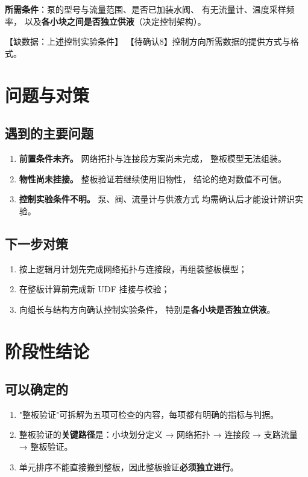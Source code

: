 \documentclass[stage2,fontset=fandol]{ydzjreport}
\begin{document}
\textbf{所需条件}：泵的型号与流量范围、是否已加装水阀、
有无流量计、温度采样频率，
以及\textbf{各小块之间是否独立供液}（决定控制架构）。

【缺数据：上述控制实验条件】
【待确认8】控制方向所需数据的提供方式与格式。

\section{问题与对策}

\subsection{遇到的主要问题}

\begin{enumerate}
  \item \textbf{前置条件未齐。} 网络拓扑与连接段方案尚未完成，
        整板模型无法组装。
  \item \textbf{物性尚未挂接。} 整板验证若继续使用旧物性，
        结论的绝对数值不可信。
  \item \textbf{控制实验条件不明。} 泵、阀、流量计与供液方式
        均需确认后才能设计辨识实验。
\end{enumerate}

\subsection{下一步对策}

\begin{enumerate}
  \item 按上逻辑月计划先完成网络拓扑与连接段，再组装整板模型；
  \item 在整板计算前完成新 UDF 挂接与校验；
  \item 向组长与结构方向确认控制实验条件，
        特别是\textbf{各小块是否独立供液}。
\end{enumerate}

\section{阶段性结论}

\subsection{可以确定的}

\begin{enumerate}
  \item "整板验证"可拆解为五项可检查的内容，每项都有明确的指标与判据。
  \item 整板验证的\textbf{关键路径}是：小块划分定义 → 网络拓扑 →
        连接段 → 支路流量 → 整板验证。
  \item 单元排序不能直接搬到整板，因此整板验证\textbf{必须独立进行}。
\end{enumerate}
\end{document}
